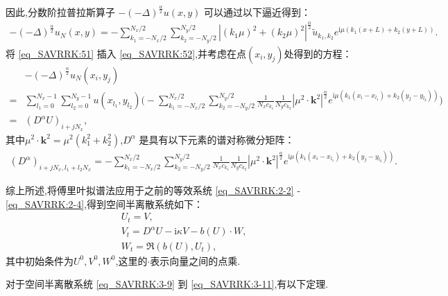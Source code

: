 因此,分数阶拉普拉斯算子 $-(-\Delta)^{\frac{\alpha}{2}} u(x, y)$ 可以通过以下逼近得到：
\begin{align}\label{eq_SAVRRK:52}
-(-\Delta)^{\frac{\alpha}{2}} u_{N}\left(x, y\right)=-\sum\limits_{k_{1}=-N_{x} / 2}^{N_{x} / 2} \sum\limits_{k_{2}=-N_{y} / 2}^{N_{y} / 2}\left|\left(k_{1} \mu\right)^{2}+\left(k_{2} \mu\right)^{2}\right|^{\frac{\alpha}{2}} \tilde{u}_{k_{1}, k_{2}} e^{\mathrm{i}\mu\left( k_{1} (x+L)+k_{2}(y+L)\right)}.
\end{align}
将 \eqref{eq_SAVRRK:51} 插入 \eqref{eq_SAVRRK:52},并考虑在点$(x_i,y_j)$处得到的方程：
\begin{align}
&-(-\Delta)^{\frac{\alpha}{2}} u_{N}\left(x_{i}, y_{j}\right)\nonumber\\
=&\sum\limits_{l_{1}=0}^{N_{x}-1} \sum\limits_{l_{2}=0}^{N_{y}-1}u(x_{l_{1}}, y_{l_{2}})\Big(-\sum\limits_{k_{1}=-N_{x} / 2}^{N_{x} / 2} \sum\limits_{k_{2}=-N_{y} / 2}^{N_{y} / 2} \frac{1}{N_{x} c_{k_{1}}} \frac{1}{N_{y} c_{k_{2}}}\left|\mu^{2} \cdot \mathbf{k}^{2}\right|^{\frac{\alpha}{2}} e^{\mathrm{i} \mu\left(k_{1}\left(x_{i}-x_{l_{1}}\right)+k_{2}\left(y_{j}-y_{l_{2}}\right)\right)}\Big)\nonumber\\
=&\left(D^{\alpha}U\right)_{i+j N_{x}},\label{eq_SAVRRK:53}
\end{align}
其中$\mu^{2} \cdot \mathbf{k}^{2}=\mu^{2}\left(k_{1}^{2}+k_{2}^{2}\right)$,$D^{\alpha}$ 是具有以下元素的谱对称微分矩阵：
\begin{align}\label{eq_SAVRRK:54}
\left(D^{\alpha}\right)_{i+j N_{x}, l_{1}+l_{2} N_{x}}=-\sum\limits_{k_{1}=-N_{x} / 2}^{N_{x} / 2} \sum\limits_{k_{2}=-N_{y} / 2}^{N_{y} / 2}\frac{1}{N_{x} c_{k_{1}}} \frac{1}{N_{y} c_{k_{2}}}\left|\mu^{2} \cdot \mathbf{k}^{2}\right|^{\frac{\alpha}{2}} e^{\mathrm{i}\mu\left(k_{1}\left(x_{i}-x_{l_{1}}\right)+k_{2}\left(y_{j}-y_{l_{2}}\right)\right)}.
\end{align}

综上所述,将傅里叶拟谱法应用于之前的等效系统 \eqref{eq_SAVRRK:2-2} - \eqref{eq_SAVRRK:2-4},得到空间半离散系统如下：
\begin{align}
& U_t=V, \label{eq_SAVRRK:3-9}\\
& V_t=D^{\alpha} U-\mathrm{i}\kappa V- b(U) \cdot W, \label{eq_SAVRRK:3-10}\\
& W_t=\Re\left(b(U), U_t\right),\label{eq_SAVRRK:3-11}
\end{align}
其中初始条件为$U^0, V^0, W^0$,这里的$\cdot$表示向量之间的点乘.

对于空间半离散系统 \eqref{eq_SAVRRK:3-9} 到 \eqref{eq_SAVRRK:3-11},有以下定理.

